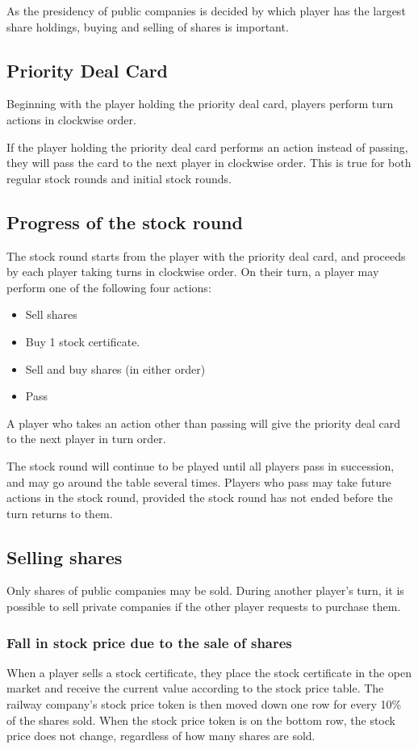 \documentclass{article}
\begin{document}
\begin{CJK}{UTF8}{min}
\begin{multicols}{2}
As the presidency of public companies is decided by which player has
the largest share holdings, buying and selling of shares is important.

\subsection{Priority Deal Card}
Beginning with the player holding the priority deal card, players
perform turn actions in clockwise order.

If the player holding the priority deal card performs an action
instead of passing, they will pass the card to the next player in
clockwise order. This is true for both regular stock rounds and
initial stock rounds.

\subsection{Progress of the stock round}
The stock round starts from the player with the priority deal card,
and proceeds by each player taking turns in clockwise order. On their
turn, a player may perform one of the following four actions:
\begin{itemize}
\item Sell shares
\item Buy 1 stock certificate.
\item Sell and buy shares (in either order)
\item Pass
\end{itemize}

A player who takes an action other than passing will give the priority
deal card to the next player in turn order.

The stock round will continue to be played until all players pass in
succession, and may go around the table several times. Players who
pass may take future actions in the stock round, provided the stock
round has not ended before the turn returns to them.

\subsection{Selling shares}
Only shares of public companies may be sold. During another player's
turn, it is possible to sell private companies if the other player
requests to purchase them.

\subsubsection{Fall in stock price due to the sale of shares}
\label{sr-sell-price-drop}
When a player sells a stock certificate, they place the stock
certificate in the open market and receive the current value according
to the stock price table. The railway company's stock price token is then moved
down one row for every 10\% of the shares sold. When the stock price token
is on the bottom row, the stock price does not change, regardless of
how many shares are sold.


\end{multicols}
\end{CJK}
\end{document}
